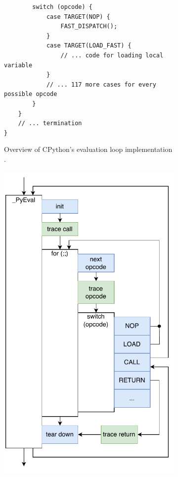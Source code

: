 \begin{figure}[H]
\begin{subfigure}[b]{0.65\textwidth}
\begin{verbatim}
        switch (opcode) {
            case TARGET(NOP) {
                FAST_DISPATCH();
            }
            case TARGET(LOAD_FAST) {
                // ... code for loading local variable
            }
            // ... 117 more cases for every possible opcode
        }
    }
    // ... termination
}
        \end{verbatim}
        \captionsetup{name=Listing}
        \caption{Overview of CPython's evaluation loop implementation \cite{victorskvortsovPythonScenes42020}.}
        \label{listing:cpython-evaluation-overview-code}
    \end{subfigure}
    \hfill
    \begin{subfigure}[b]{0.3\textwidth}
       \centering
       \includegraphics[width=\textwidth]{images/profiling_bytecode/python_eval.drawio.pdf}

\end{subfigure}
\end{figure}
